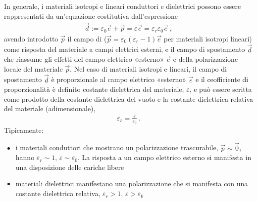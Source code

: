 \documentclass[letterpaper,10pt,italian]{jupyterBook}
\begin{document}
\sphinxAtStartPar
In generale, i materiali isotropi e lineari conduttori e dielettrici possono essere rappresentati da un’equazione costitutiva dall’espressione
\begin{equation*}
\begin{split}\vec{d} := \varepsilon_0 \vec{e} + \vec{p} = \varepsilon \vec{e} = \varepsilon_r \varepsilon_0 \vec{e} \ ,\end{split}
\end{equation*}
\sphinxAtStartPar
avendo introdotto \(\vec{p}\) il campo di  (\(\vec{p} = \varepsilon_0 ( \varepsilon_r - 1) \vec{e}\) per materiali isotropi lineari) come risposta del materiale a campi elettrici esterni, e il campo di spostamento \(\vec{d}\) che riassume gli effetti del campo elettrico «esterno» \(\vec{e}\) e della polarizzazione locale del materiale \(\vec{p}\). Nel caso di materiali isotropi e lineari, il campo di spostamento \(\vec{d}\) è proporzionale al campo elettrico «esterno» \(\vec{e}\) e il ceofficiente di proporzionalità è definito costante dielettrica del materiale, \(\varepsilon\), e può essere scritta come prodotto della costante dielettrica del vuoto e la costante dielettrica relativa del materiale (adimensionale),
\begin{equation*}
\begin{split}\varepsilon_r = \frac{\varepsilon}{\varepsilon_0} \ .\end{split}
\end{equation*}
\sphinxAtStartPar
Tipicamente:
\begin{itemize}
\item {} 
\sphinxAtStartPar
i materiali conduttori che mostrano un polarizzazione trascurabile, \(\vec{p} \sim \vec{0}\), hanno \(\varepsilon_r \sim 1\), \(\varepsilon \sim \varepsilon_0\). La risposta a un campo elettrico esterno si manifesta in una disposizione delle cariche libere

\item {} 
\sphinxAtStartPar
materiali dielettrici manifestano una polarizzazione che si manifesta con una costante dielettrica relativa, \(\varepsilon_r > 1\), \(\varepsilon > \varepsilon_0\)

\end{itemize}
\end{document}

